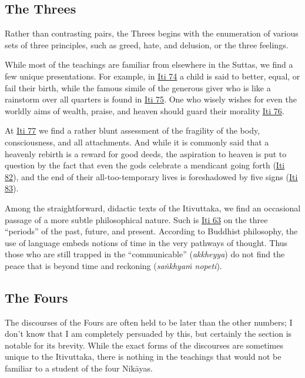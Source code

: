 \documentclass[12pt,openany]{book}%
\begin{document}
\subsection*{The Threes}

Rather than contrasting pairs, the Threes begins with the enumeration of various sets of three principles, such as greed, hate, and delusion, or the three feelings.

While most of the teachings are familiar from elsewhere in the Suttas, we find a few unique presentations. For example, in \href{https://suttacentral.net/iti74/en/sujato}{Iti 74} a child is said to better, equal, or fail their birth, while the famous simile of the generous giver who is like a rainstorm over all quarters is found in \href{https://suttacentral.net/iti75/en/sujato}{Iti 75}. One who wisely wishes for even the worldly aims of wealth, praise, and heaven should guard their morality \href{https://suttacentral.net/iti76/en/sujato}{Iti 76}.

At \href{https://suttacentral.net/iti77/en/sujato}{Iti 77} we find a rather blunt assessment of the fragility of the body, consciousness, and all attachments. And while it is commonly said that a heavenly rebirth is a reward for good deeds, the aspiration to heaven is put to question by the fact that even the gods celebrate a mendicant going forth (\href{https://suttacentral.net/iti82/en/sujato}{Iti 82}), and the end of their all-too-temporary lives is foreshadowed by five signs (\href{https://suttacentral.net/iti83/en/sujato}{Iti 83}).

Among the straightforward, didactic texts of the Itivuttaka, we find an occasional passage of a more subtle philosophical nature. Such is \href{https://suttacentral.net/iti63/en/sujato}{Iti 63} on the three “periods” of the past, future, and present. According to Buddhist philosophy, the use of language embeds notions of time in the very pathways of thought. Thus those who are still trapped in the “communicable” (\emph{akkheyya}) do not find the peace that is beyond time and reckoning (\emph{\textsanskrit{saṅkhyaṁ} nopeti}).

\subsection*{The Fours}

The discourses of the Fours are often held to be later than the other numbers; I don’t know that I am completely persuaded by this, but certainly the section is notable for its brevity. While the exact forms of the discourses are sometimes unique to the Itivuttaka, there is nothing in the teachings that would not be familiar to a student of the four \textsanskrit{Nikāyas}.
\end{document}
